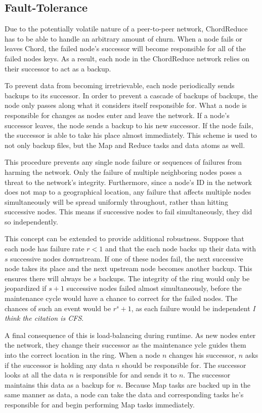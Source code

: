 \subsection{Fault-Tolerance}
Due to the potentially volatile nature of a peer-to-peer network, ChordReduce has to be able to handle an arbitrary amount of churn. When a node fails or leaves Chord, the failed node's successor will become responsible for all of the failed nodes keys. As a result, each node in the ChordReduce network relies on their successor to act as a backup.  

To prevent data from becoming irretrievable, each node periodically sends backups to its successor.  In order to prevent a cascade of backups of backups, the node only passes along what it considers itself responsible for.  What a node is responsible for changes as nodes enter and leave the network.  If a node's successor leaves, the node sends a backup to his new successor.  If the node fails, the successor is able to take his place almost immediately.  This scheme is used to not only backup files, but the Map and Reduce tasks and data atoms as well.

This procedure prevents any single node failure or sequences of failures from harming the network. Only the failure of multiple neighboring nodes poses a threat to the network's integrity.  Furthermore, since a node's ID in the network does not map to a geographical location, any failure that affects multiple nodes simultaneously will be spread uniformly throughout, rather than hitting successive nodes.  This means if successive nodes to fail simultaneously, they did so independently.

This concept can be extended to provide additional robustness.  Suppose that each node has failure rate $r < 1$ and that the each node backs up their data with $s$ successive nodes downstream. If one of these nodes fail, the next successive node takes its place and the next upstream node becomes another backup. This ensures there will always be $s$ backups. The integrity of the ring would only be jeopardized if $s+1$ successive nodes failed almost simultaneously, before the maintenance cycle would have a chance to correct for the failed nodes.  The chances of such an event would be $r^s+1$, as each failure would be independent \textit{I think the citation is CFS}.


A final consequence of this is load-balancing during runtime.  As new nodes enter the network, they change their successor as the maintenance  ycle guides them into the correct location in the ring.  When a node $n$ changes his successor, $n$ asks if the successor is holding any data $n$ should be responsible for.  The successor looks at all the data $n$ is responsible for and sends it to $n$.  The successor maintains this data as a backup for $n$.  Because Map tasks are backed up in the same manner as data, a node can take the data and corresponding tasks he's responsible for and begin performing Map tasks immediately.


